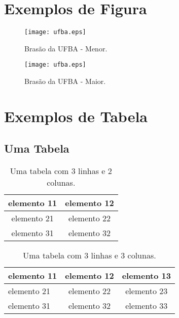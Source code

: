 \documentclass[phd, classic, a4paper]{ufbathesis}
\begin{document}
\section{Exemplos de Figura}

\begin{figure}[htbp]
\begin{center}
  \texttt{[image: ufba.eps]}
\caption{Bras\~{a}o da UFBA - Menor.}
\label{default-regular1}
\end{center}
\end{figure}

\begin{figure}[htbp]
\begin{center}
  \texttt{[image: ufba.eps]}
\caption{Bras\~{a}o da UFBA - Maior.}
\label{default-regular2}
\end{center}
\end{figure}

\lipsum

\section{Exemplos de Tabela}
\subsection{Uma Tabela}
\begin{table}[htbp]
\caption{Uma tabela com 3 linhas e 2 colunas.}
\begin{center}
\begin{tabular}{|c|c|} 
\hline
elemento 11 & elemento 12 \\ \hline
elemento 21 & elemento 22 \\ \hline
elemento 31 & elemento 32 \\
\hline
\end{tabular}
\end{center}
\label{default-table1}
\end{table}%

\lipsum

\begin{table}[htbp]
\caption{Uma tabela com 3 linhas e 3 colunas.}
\begin{center}
\begin{tabular}{|l|c|c|} 
\hline
elemento 11 & elemento 12 & elemento 13\\ \hline
elemento 21 & elemento 22 & elemento 23\\ \hline
elemento 31 & elemento 32 & elemento 33\\
\hline
\end{tabular}
\end{center}
\label{default-table2}
\end{table}%
\end{document}
